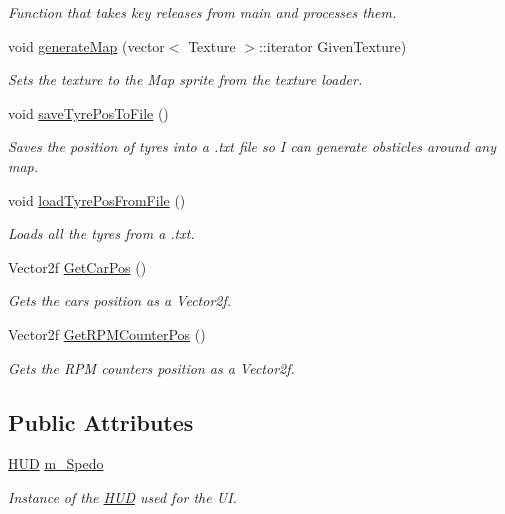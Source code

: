 \begin{DoxyCompactItemize}
\begin{DoxyCompactList}\small\item\em Function that takes key releases from main and processes them. \end{DoxyCompactList}\item 
void \hyperlink{class_game_a917e25c51c6b20c74e9f9a441c72717e}{generate\+Map} (vector$<$ Texture $>$\+::iterator Given\+Texture)
\begin{DoxyCompactList}\small\item\em Sets the texture to the Map sprite from the texture loader. \end{DoxyCompactList}\item 
void \hyperlink{class_game_a907fa46ec6aa134985c1845d4cf20de2}{save\+Tyre\+Pos\+To\+File} ()
\begin{DoxyCompactList}\small\item\em Saves the position of tyres into a .txt file so I can generate obsticles around any map. \end{DoxyCompactList}\item 
void \hyperlink{class_game_a16d92220f4808914017486e36c7e44cb}{load\+Tyre\+Pos\+From\+File} ()
\begin{DoxyCompactList}\small\item\em Loads all the tyres from a .txt. \end{DoxyCompactList}\item 
Vector2f \hyperlink{class_game_aac1c9b79494aa3ec9564134bcbe885da}{Get\+Car\+Pos} ()
\begin{DoxyCompactList}\small\item\em Gets the cars position as a Vector2f. \end{DoxyCompactList}\item 
Vector2f \hyperlink{class_game_a1ab3e29bdade1f0a90723878a34abef5}{Get\+R\+P\+M\+Counter\+Pos} ()
\begin{DoxyCompactList}\small\item\em Gets the R\+P\+M counters position as a Vector2f. \end{DoxyCompactList}\end{DoxyCompactItemize}
\subsection*{Public Attributes}
\begin{DoxyCompactItemize}
\item 
\hypertarget{class_game_a848d449a2e906074d4a28668ad36bdc5}{}\hyperlink{class_h_u_d}{H\+U\+D} \hyperlink{class_game_a848d449a2e906074d4a28668ad36bdc5}{m\+\_\+\+Spedo}\label{class_game_a848d449a2e906074d4a28668ad36bdc5}

\begin{DoxyCompactList}\small\item\em Instance of the \hyperlink{class_h_u_d}{H\+U\+D} used for the U\+I. \end{DoxyCompactList}\end{DoxyCompactItemize}


